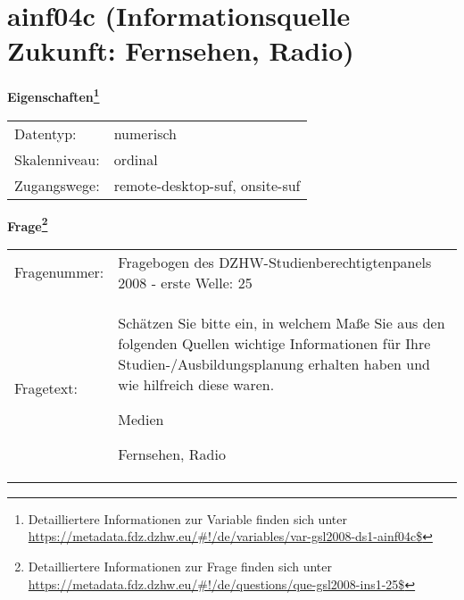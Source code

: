 
    \setcounter{footnote}{0}

    \vspace*{-1.8cm}
	\section{ainf04c (Informationsquelle Zukunft: Fernsehen, Radio)}
	\label{section:ainf04c}



    \vspace*{0.5cm}
    \noindent\textbf{Eigenschaften\footnote{Detailliertere Informationen zur Variable finden sich unter
		\url{https://metadata.fdz.dzhw.eu/\#!/de/variables/var-gsl2008-ds1-ainf04c$}}}\\
	\begin{tabularx}{\hsize}{@{}lX}
	Datentyp: & numerisch \\
	Skalenniveau: & ordinal \\
	Zugangswege: &
	  remote-desktop-suf, 
	  onsite-suf
 \\
    \end{tabularx}



				\vspace*{0.5cm}
                \noindent\textbf{Frage\footnote{Detailliertere Informationen zur Frage finden sich unter
		              \url{https://metadata.fdz.dzhw.eu/\#!/de/questions/que-gsl2008-ins1-25$}}}\\
				\begin{tabularx}{\hsize}{@{}lX}
					Fragenummer: &
					  Fragebogen des DZHW-Studienberechtigtenpanels 2008 - erste Welle:
					  25
 \\
					Fragetext: & Schätzen Sie bitte ein, in welchem Maße Sie aus den folgenden Quellen wichtige Informationen für Ihre Studien-/Ausbildungsplanung erhalten haben und wie hilfreich diese waren.\par  Medien\par  Fernsehen, Radio \\
				\end{tabularx}






